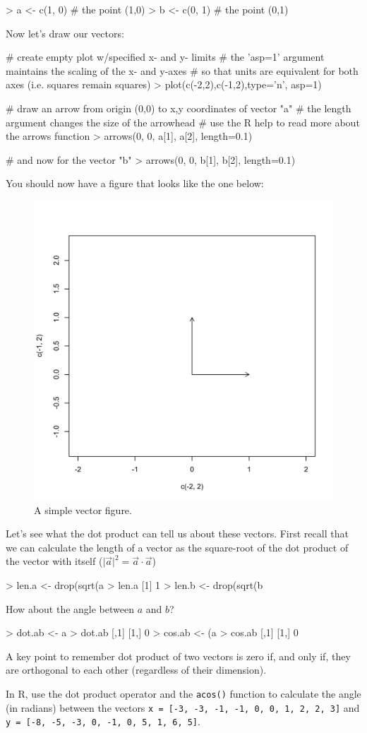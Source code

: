 \begin{R}
> a <- c(1, 0) # the point (1,0)
> b <- c(0, 1) # the point (0,1)
\end{R}
%
Now let's draw our vectors:
%
\begin{R}
# create empty plot w/specified x- and y- limits
# the 'asp=1' argument maintains the scaling of the x- and y-axes
# so that units are equivalent for both axes (i.e. squares remain squares)
> plot(c(-2,2),c(-1,2),type='n', asp=1)

# draw an arrow from origin (0,0) to x,y coordinates of vector "a"
# the length argument changes the size of the arrowhead
# use the R help to read more about the arrows function
> arrows(0, 0, a[1], a[2], length=0.1)

# and now for the vector "b"
> arrows(0, 0, b[1], b[2], length=0.1)
\end{R}
%
You should now have a figure that looks like the one below:
\begin{figure}[htbp]
\centering
\includegraphics[width=0.33\columnwidth]{./figures/hands-on2/rightangle.pdf}
\caption{A simple vector figure.}
\end{figure}
%
Let's see what the dot product can tell us about these vectors. First recall that we can calculate the length of a vector as the square-root of the dot product of the vector with itself ($\vert\vec{a}\vert^2  =  \vec{a} \cdot \vec{a}$)
\begin{R}
> len.a <- drop(sqrt(a %
> len.a
[1] 1
> len.b <- drop(sqrt(b %
\end{R}
%
How about the angle between $a$ and $b$?
\begin{R}
> dot.ab <- a %
> dot.ab
     [,1]
[1,]    0
> cos.ab <- (a %
> cos.ab
     [,1]
[1,]    0
\end{R}
A key point to remember dot product of two vectors is zero if, and only if, they are orthogonal to each other (regardless of their dimension).


\begin{assignment}
In R, use the dot product operator and the
\lstinline!acos()! function to calculate the angle (in radians) between
the vectors \lstinline!x = [-3, -3, -1, -1, 0, 0, 1, 2, 2, 3]! and
\lstinline!y = [-8, -5, -3, 0, -1, 0, 5, 1, 6, 5]!.
\end{assignment}

